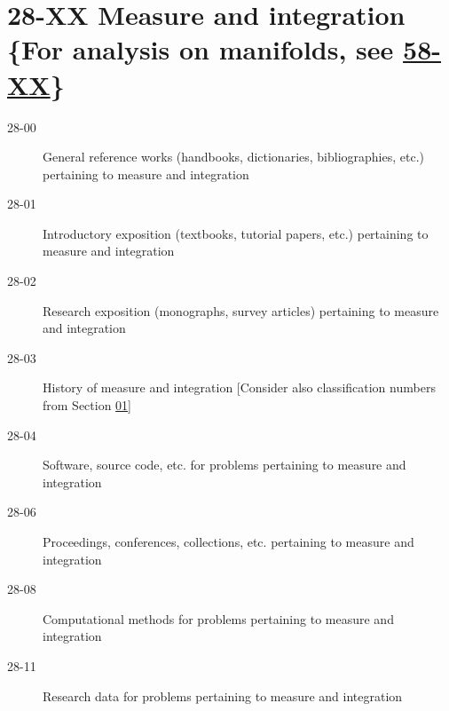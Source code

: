 \documentclass[letterpaper]{article}
\begin{document}
\section*{28-XX Measure and integration \{For analysis on manifolds, see \hyperref[58-XX]{58-XX}\} }\label{28-XX}
\begin{description}
\item [28-00]\label{28-00} General reference works (handbooks, dictionaries, bibliographies, etc.) pertaining to measure and integration
\item [28-01]\label{28-01} Introductory exposition (textbooks, tutorial papers, etc.) pertaining to measure and integration
\item [28-02]\label{28-02} Research exposition (monographs, survey articles) pertaining to measure and integration
\item [28-03]\label{28-03} History of measure and integration [Consider also classification numbers from Section \hyperref[01-XX]{01}]
\item [28-04]\label{28-04} Software, source code, etc. for problems pertaining to measure and integration
\item [28-06]\label{28-06} Proceedings, conferences, collections, etc. pertaining to measure and integration
\item [28-08]\label{28-08} Computational methods for problems pertaining to measure and integration
\item [28-11]\label{28-11} Research data for problems pertaining to measure and integration
\end{description}
\end{document}
